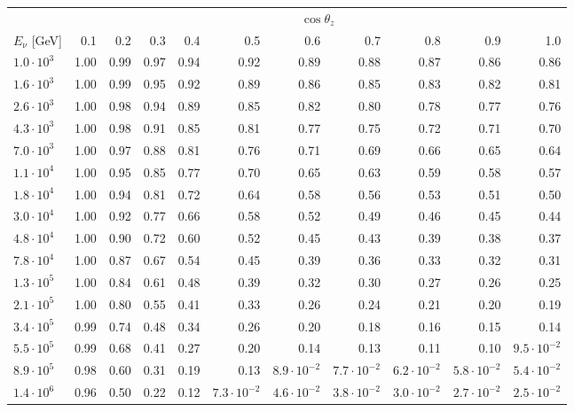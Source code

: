 \documentclass[aps,prd,showpacs,letterpaper,onecolumn,longbibliography,superscriptaddress,notitlepage,nofootinbib]{revtex4-1}%
\begin{document}
\begin{table}[h]
\centering
\begin{tabular*}{\textwidth}{l @{\extracolsep{\fill}} r r r r r r r r r r}
\toprule
& \multicolumn{10}{c}{$\cos \theta_z$}\\
\cmidrule{2-11}
$E_\nu$ [GeV] & 0.1 & 0.2 & 0.3 & 0.4 & 0.5 & 0.6 & 0.7 & 0.8 & 0.9 & 1.0 \\ 
\midrule
$1.0\cdot10^{3}$ & 1.00 & 0.99 & 0.97 & 0.94 & 0.92 & 0.89 & 0.88 & 0.87 & 0.86 & 0.86 \\ \hline
$1.6\cdot10^{3}$ & 1.00 & 0.99 & 0.95 & 0.92 & 0.89 & 0.86 & 0.85 & 0.83 & 0.82 & 0.81 \\ \hline
$2.6\cdot10^{3}$ & 1.00 & 0.98 & 0.94 & 0.89 & 0.85 & 0.82 & 0.80 & 0.78 & 0.77 & 0.76 \\ \hline
$4.3\cdot10^{3}$ & 1.00 & 0.98 & 0.91 & 0.85 & 0.81 & 0.77 & 0.75 & 0.72 & 0.71 & 0.70 \\ \hline
$7.0\cdot10^{3}$ & 1.00 & 0.97 & 0.88 & 0.81 & 0.76 & 0.71 & 0.69 & 0.66 & 0.65 & 0.64 \\ \hline
$1.1\cdot10^{4}$ & 1.00 & 0.95 & 0.85 & 0.77 & 0.70 & 0.65 & 0.63 & 0.59 & 0.58 & 0.57 \\ \hline
$1.8\cdot10^{4}$ & 1.00 & 0.94 & 0.81 & 0.72 & 0.64 & 0.58 & 0.56 & 0.53 & 0.51 & 0.50 \\ \hline
$3.0\cdot10^{4}$ & 1.00 & 0.92 & 0.77 & 0.66 & 0.58 & 0.52 & 0.49 & 0.46 & 0.45 & 0.44 \\ \hline
$4.8\cdot10^{4}$ & 1.00 & 0.90 & 0.72 & 0.60 & 0.52 & 0.45 & 0.43 & 0.39 & 0.38 & 0.37 \\ \hline
$7.8\cdot10^{4}$ & 1.00 & 0.87 & 0.67 & 0.54 & 0.45 & 0.39 & 0.36 & 0.33 & 0.32 & 0.31 \\ \hline
$1.3\cdot10^{5}$ & 1.00 & 0.84 & 0.61 & 0.48 & 0.39 & 0.32 & 0.30 & 0.27 & 0.26 & 0.25 \\ \hline
$2.1\cdot10^{5}$ & 1.00 & 0.80 & 0.55 & 0.41 & 0.33 & 0.26 & 0.24 & 0.21 & 0.20 & 0.19 \\ \hline
$3.4\cdot10^{5}$ & 0.99 & 0.74 & 0.48 & 0.34 & 0.26 & 0.20 & 0.18 & 0.16 & 0.15 & 0.14 \\ \hline
$5.5\cdot10^{5}$ & 0.99 & 0.68 & 0.41 & 0.27 & 0.20 & 0.14 & 0.13 & 0.11 & 0.10 & $9.5\cdot10^{-2}$ \\ \hline
$8.9\cdot10^{5}$ & 0.98 & 0.60 & 0.31 & 0.19 & 0.13 & $8.9\cdot10^{-2}$ & $7.7\cdot10^{-2}$ & $6.2\cdot10^{-2}$ & $5.8\cdot10^{-2}$ & $5.4\cdot10^{-2}$ \\ \hline
$1.4\cdot10^{6}$ & 0.96 & 0.50 & 0.22 & 0.12 & $7.3\cdot10^{-2}$ & $4.6\cdot10^{-2}$ & $3.8\cdot10^{-2}$ & $3.0\cdot10^{-2}$ & $2.7\cdot10^{-2}$ & $2.5\cdot10^{-2}$ \\ \hline

\end{tabular*}
\end{table}
\end{document}
